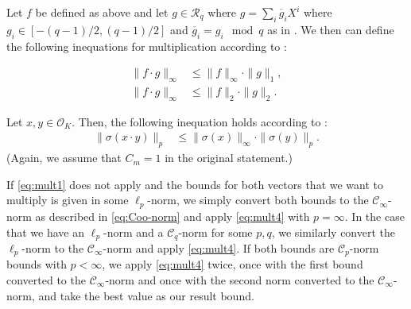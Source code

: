 \begin{theorem}\label{th:mult}
    Let $f$ be defined as above and let $g \in \mathcal{R}_q$ where $g = \sum_i \overline{g}_i X^i$ where $g_i \in \left[-(q-1)/2, (q-1)/2\right]$ and $\overline{g}_i = g_i \mod q$ as in \cite{BDLOP18}. We then can define the following inequations for multiplication according to \cite{BDLOP18}:

    \begin{equation}\label{eq:mult1}
        \begin{aligned}
            \|f \cdot g\|_\infty & \leq \|f\|_\infty \cdot \|g\|_1, \\
            \|f \cdot g\|_\infty & \leq \|f\|_2 \cdot \|g\|_2.
        \end{aligned}
    \end{equation}

    Let $x, y \in \mathcal{O}_K$. Then, the following inequation holds according to \cite{DPSZ12}:
    \begin{align}
        \| \sigma(x \cdot y) \|_p & \leq  \| \sigma(x) \|_\infty \cdot \| \sigma(y) \|_p. \label{eq:mult4}
    \end{align}
    (Again, we assume that $C_m = 1$ in the original statement.)
\end{theorem}

If \cref{eq:mult1} does not apply and the bounds for both vectors that we want to multiply is given in some $\ell_p$-norm, we simply convert both bounds to the $\mathcal{C}_\infty$-norm as described in \cref{eq:Coo-norm} and apply \cref{eq:mult4} with $p=\infty$. In the case that we have an $\ell_p$-norm and a $\mathcal{C}_q$-norm for some $p,q$, we similarly convert the $\ell_p$-norm to the $\mathcal{C}_\infty$-norm and apply \cref{eq:mult4}. If both bounds are $\mathcal{C}_p$-norm bounds with $p < \infty$, we apply \cref{eq:mult4} twice, once with the first bound converted to the $\mathcal{C}_\infty$-norm and once with the second norm converted to the $\mathcal{C}_\infty$-norm, and take the best value as our result bound.



